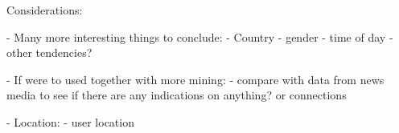 \documentclass[Main]{subfiles}
\begin{document}
Considerations:

- Many more interesting things to conclude:
    - Country
    - gender
    - time of day
    - other tendencies?
    
- If were to used together with more mining:
    - compare with data from news media to see if there are any indications on anything? or connections


- Location:
    - user location
\end{document}
